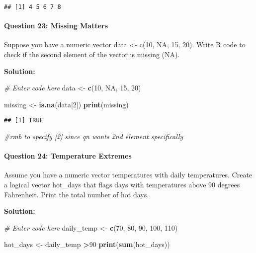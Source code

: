 \documentclass[
]{article}
\newenvironment{Shaded}{\begin{snugshade}}{\end{snugshade}}
\newcommand{\CommentTok}[1]{\textcolor[rgb]{0.56,0.35,0.01}{\textit{#1}}}
\newcommand{\ConstantTok}[1]{\textcolor[rgb]{0.56,0.35,0.01}{#1}}
\newcommand{\DecValTok}[1]{\textcolor[rgb]{0.00,0.00,0.81}{#1}}
\newcommand{\FunctionTok}[1]{\textcolor[rgb]{0.13,0.29,0.53}{\textbf{#1}}}
\newcommand{\NormalTok}[1]{#1}
\newcommand{\OtherTok}[1]{\textcolor[rgb]{0.56,0.35,0.01}{#1}}
\newcommand{\SpecialCharTok}[1]{\textcolor[rgb]{0.81,0.36,0.00}{\textbf{#1}}}
\begin{document}
\begin{verbatim}
## [1] 4 5 6 7 8
\end{verbatim}

\hypertarget{question-23-missing-matters}{%
\paragraph{Question 23: Missing
Matters}\label{question-23-missing-matters}}

Suppose you have a numeric vector data \textless- c(10, NA, 15, 20).
Write R code to check if the second element of the vector is missing
(NA).

\textbf{Solution:}

\begin{Shaded}
\begin{Highlighting}[]
\CommentTok{\# Enter code here}
\NormalTok{data }\OtherTok{\textless{}{-}} \FunctionTok{c}\NormalTok{(}\DecValTok{10}\NormalTok{, }\ConstantTok{NA}\NormalTok{, }\DecValTok{15}\NormalTok{, }\DecValTok{20}\NormalTok{)}

\NormalTok{missing }\OtherTok{\textless{}{-}} \FunctionTok{is.na}\NormalTok{(data[}\DecValTok{2}\NormalTok{])}
\FunctionTok{print}\NormalTok{(missing)}
\end{Highlighting}
\end{Shaded}

\begin{verbatim}
## [1] TRUE
\end{verbatim}

\begin{Shaded}
\begin{Highlighting}[]
\CommentTok{\#rmb to specify [2] since qn wants 2nd element specifically}
\end{Highlighting}
\end{Shaded}

\hypertarget{question-24-temperature-extremes}{%
\paragraph{Question 24: Temperature
Extremes}\label{question-24-temperature-extremes}}

Assume you have a numeric vector temperatures with daily temperatures.
Create a logical vector hot\_days that flags days with temperatures
above 90 degrees Fahrenheit. Print the total number of hot days.

\textbf{Solution:}

\begin{Shaded}
\begin{Highlighting}[]
\CommentTok{\# Enter code here}
\NormalTok{daily\_temp }\OtherTok{\textless{}{-}} \FunctionTok{c}\NormalTok{(}\DecValTok{70}\NormalTok{, }\DecValTok{80}\NormalTok{, }\DecValTok{90}\NormalTok{, }\DecValTok{100}\NormalTok{, }\DecValTok{110}\NormalTok{)}

\NormalTok{hot\_days }\OtherTok{\textless{}{-}}\NormalTok{ daily\_temp }\SpecialCharTok{\textgreater{}}\DecValTok{90}
\FunctionTok{print}\NormalTok{(}\FunctionTok{sum}\NormalTok{(hot\_days))}
\end{Highlighting}
\end{Shaded}
\end{document}
